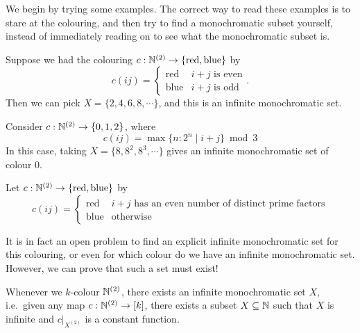 \documentclass[a4paper]{article}
\begin{document}
We begin by trying some examples. The correct way to read these examples is to stare at the colouring, and then try to find a monochromatic subset yourself, instead of immediately reading on to see what the monochromatic subset is.
\begin{eg}
  Suppose we had the colouring $c: \mathbb{N}^{(2)} \to \{\mathrm{red}, \mathrm{blue}\}$ by
  \[
    c(ij) =
    \begin{cases}
      \mathrm{red} & i + j \text{ is even}\\
      \mathrm{blue} & i + j \text{ is odd}
    \end{cases}.
  \]
  Then we can pick $X = \{2, 4, 6, 8, \cdots \}$, and this is an infinite monochromatic set.
\end{eg}

\begin{eg}
  Consider $c: \mathbb{N}^{(2)} \to \{0, 1, 2\}$, where
  \[
    c(ij) = \max \{n: 2^n \mid i + j\} \bmod 3
  \]
  In this case, taking $X = \{8, 8^2, 8^3, \cdots\}$ gives an infinite monochromatic set of colour $0$.
\end{eg}

\begin{eg}
  Let $c: \mathbb{N}^{(2)} \to \{\mathrm{red}, \mathrm{blue}\}$ by
  \[
    c(ij) =
    \begin{cases}
      \mathrm{red} & i + j\text{ has an even number of distinct prime factors}\\
      \mathrm{blue} & \mathrm{otherwise}
    \end{cases}
  \]
\end{eg}
It is in fact an open problem to find an explicit infinite monochromatic set for this colouring, or even for which colour do we have an infinite monochromatic set. However, we can prove that such a set must exist!

\begin{thm}
  Whenever we $k$-colour $\mathbb{N}^{(2)}$, there exists an infinite monochromatic set $X$, i.e.\ given any map $c: \mathbb{N}^{(2)} \to [k]$, there exists a subset $X \subseteq \mathbb{N}$ such that $X$ is infinite and $c|_{X^{(2)}}$ is a constant function.
\end{thm}
\end{document}
